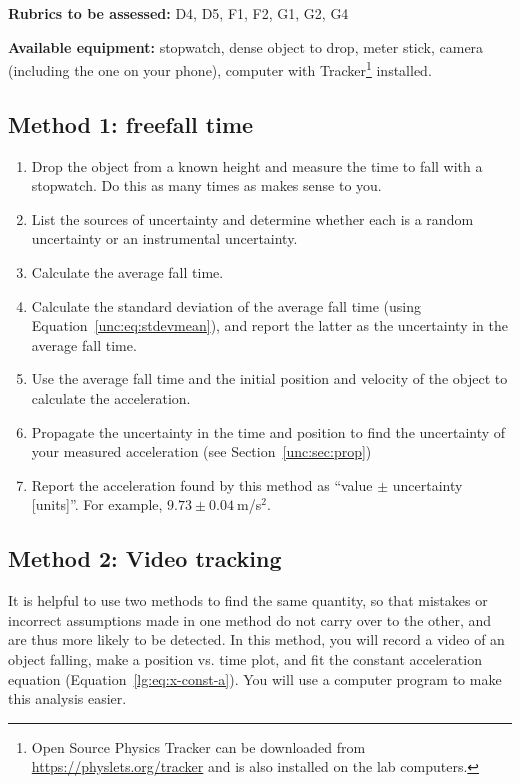 \textbf{Rubrics to be assessed:} D4, D5, F1, F2, G1, G2, G4

\textbf{Available equipment:} stopwatch, dense object to drop, meter stick, camera (including the one on your phone), computer with Tracker\footnote{Open Source Physics Tracker can be downloaded from \url{https://physlets.org/tracker} and is also installed on the lab computers.} installed.

\subsection{Method 1: freefall time}

\begin{enumerate}
	\item Drop the object from a known height and measure the time to fall with a stopwatch. Do this as many times as makes sense to you.
	
	\item List the sources of uncertainty and determine whether each is a random uncertainty or an instrumental uncertainty.
	
	\item Calculate the average fall time.
	
	\item Calculate the standard deviation of the average fall time (using Equation~\ref{unc:eq:stdevmean}), and report the latter as the uncertainty in the average fall time.
	
	\item Use the average fall time and the initial position and velocity of the object to calculate the acceleration.
	
	\item Propagate the uncertainty in the time and position to find the uncertainty of your measured acceleration (see Section~\ref{unc:sec:prop})
	
	\item Report the acceleration found by this method as ``value $\pm$ uncertainty [units]''. For example, $9.73 \pm 0.04\:$m/s$^2$.
\end{enumerate}

\subsection{Method 2: Video tracking}

It is helpful to use two methods to find the same quantity, so that mistakes or incorrect assumptions made in one method do not carry over to the other, and are thus more likely to be detected. In this method, you will record a video of an object falling, make a position vs. time plot, and fit the constant acceleration equation (Equation~\ref{lg:eq:x-const-a}). You will use a computer program to make this analysis easier.

